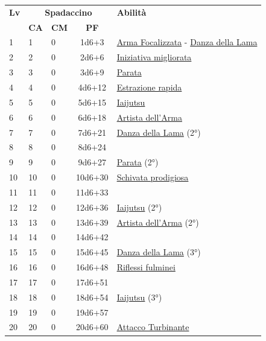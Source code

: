 {\begin{multicols}{2}


\noindent\begin{tabularx}{\linewidth}{p{0.3cm}|p{0.3cm}p{0.3cm}c|X|}
	\toprule
 \rowcolor{gray!20}	\textbf{Lv} & \multicolumn{3}{c|}{\textbf{Spadaccino}} & \textbf{Abilità} \\
& \centering\arraybackslash \textbf{CA} & \centering\arraybackslash \textbf{CM} & \centering\arraybackslash \textbf{PF} & \\
	\toprule
	1 &1	& 0	&	1d6+3	&\hyperlink{Arma Focalizzata}{Arma Focalizzata} - \hyperlink{Danza della Lama}{Danza della Lama}\\
 \rowcolor{gray!20}2	&	2	& 0	&	2d6+6	&\hyperlink{Iniziativa migliorata}{Iniziativa migliorata}\\
	3	&	3	& 0	&	3d6+9	&\hyperlink{Parata}{Parata}\\
 \rowcolor{gray!20}4	&	4	& 0	&	4d6+12	&\hyperlink{Estrazione rapida}{Estrazione rapida}\\
	5	&	5	& 0	&	5d6+15	&\hyperlink{Iaijutsu}{Iaijutsu}\\
 \rowcolor{gray!20}6	&	6	& 0	&	6d6+18	&\hyperlink{Artista dell'Arma}{Artista dell'Arma}\\
	7	&	7	& 0	&	7d6+21	&\hyperlink{Danza della Lama}{Danza della Lama} (2°)\\
 \rowcolor{gray!20}8	&	8	& 0	&	8d6+24	&\\
	9	&	9	& 0	&	9d6+27	&\hyperlink{Parata}{Parata} (2°)\\
 \rowcolor{gray!20}10	&	10	& 0	&	10d6+30	&\hyperlink{Schivata prodigiosa}{Schivata prodigiosa}\\
	11	&	11	& 0	&	11d6+33	&\\
 \rowcolor{gray!20}12	&	12	& 0	&	12d6+36	&\hyperlink{Iaijutsu}{Iaijutsu} (2°)\\
	13	&	13	& 0	&	13d6+39	&\hyperlink{Artista dell'Arma}{Artista dell'Arma} (2°)\\
 \rowcolor{gray!20}14	&	14	& 0	&	14d6+42	&\\
	15	&	15	& 0	&	15d6+45	&\hyperlink{Danza della Lama}{Danza della Lama} (3°)\\
 \rowcolor{gray!20}16	&	16	& 0	&	16d6+48	&\hyperlink{Riflessi fulminei}{Riflessi fulminei}\\
	17	&	17	& 0	&	17d6+51	&\\
 \rowcolor{gray!20}18	&	18	& 0	&	18d6+54	&\hyperlink{Iaijutsu}{Iaijutsu} (3°)\\
	19	&	19	& 0	&	19d6+57	&\\
 \rowcolor{gray!20}20	&	20	& 0	&	20d6+60	&\hyperlink{Attacco Turbinante}{Attacco Turbinante}\\
\end{tabularx}


\end{multicols}}
